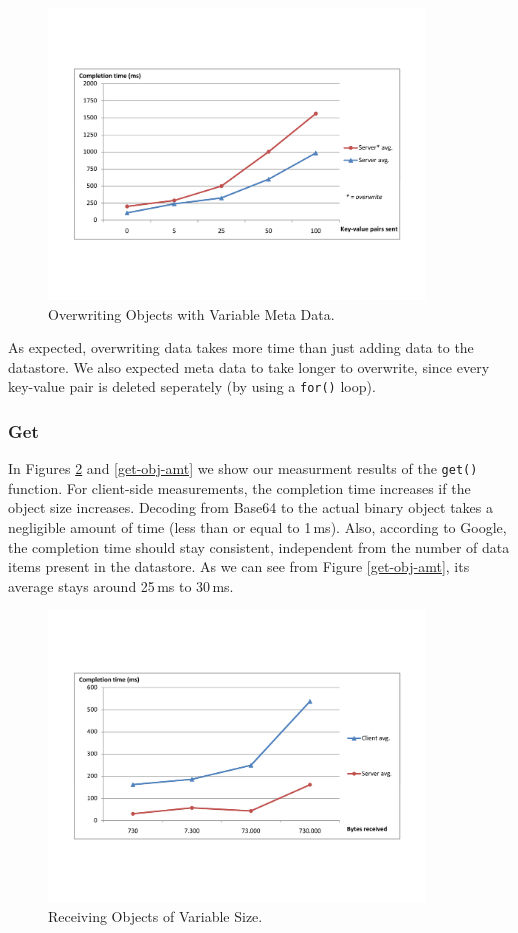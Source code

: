 \begin{figure} %
\begin{center}
\includegraphics[trim=5cm 4cm 5cm 5cm,width=10cm]{./figures/ovw_md.pdf}
\caption{Overwriting Objects with Variable Meta Data. \label{ovw-md-size}}
\end{center}
\end{figure}

As expected, overwriting data takes more time than just adding data to the
datastore. We also expected meta data to take longer to overwrite, since every
key-value pair is deleted seperately (by using a \texttt{for()} loop).
 
\subsubsection{Get}
In Figures \ref{get-obj-size} and \ref{get-obj-amt} we show our measurment
results of the \texttt{get()} function. For client-side measurements, the
completion time increases if the object size increases. Decoding from Base64 to
the actual binary object takes a negligible amount of time (less than or equal to
1\,ms). Also, according to Google, the completion time should stay consistent,
independent from the number of data items present in the datastore. As we can see
from Figure \ref{get-obj-amt}, its average stays around 25\,ms to 30\,ms.

\begin{figure} %
\begin{center}
\includegraphics[trim=5cm 4cm 5cm 5cm,width=10cm]{./figures/get_obj.pdf}
\caption{Receiving Objects of Variable Size. \label{get-obj-size}}
\end{center}
\end{figure}


